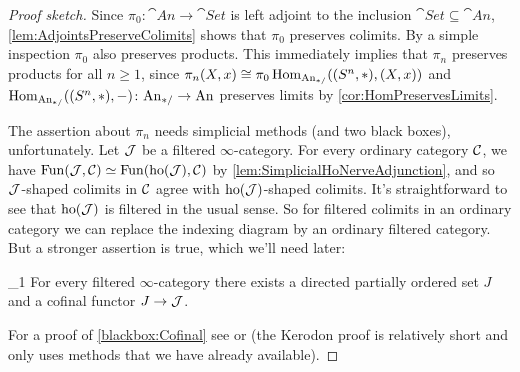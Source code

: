\begin{proof}[Proof sketch]
	Since $\pi_0\colon\cat{An}\rightarrow\cat{Set}$ is left adjoint to the inclusion $\cat{Set}\subseteq \cat{An}$, \cref{lem:AdjointsPreserveColimits} shows that $\pi_0$ preserves colimits. By a simple inspection $\pi_0$ also preserves products. This immediately implies that $\pi_n$ preserves products for all $n\geqslant 1$, since $\pi_n(X,x)\cong \pi_0\operatorname{Hom}_{\mathrm{An}_{*/}}((S^n,*),(X,x))$ and $\operatorname{Hom}_{\mathrm{An}_{*/}}((S^n,*),-)\colon \mathrm{An}_{*/}\rightarrow \mathrm{An}$ preserves limits by \cref{cor:HomPreservesLimits}.
	
	The assertion about $\pi_n$ needs simplicial methods (and two black boxes), unfortunately. Let $\mathcal{J}$ be a filtered $\infty$-category. For every ordinary category $\mathcal{C}$, we have $\operatorname{Fun}(\mathcal{J},\mathcal{C})\simeq \operatorname{Fun}(\operatorname{ho}(\mathcal{J}),\mathcal{C})$ by \cref{lem:SimplicialHoNerveAdjunction}, and so $\mathcal{J}$-shaped colimits in $\mathcal{C}$ agree with $\operatorname{ho}(\mathcal{J})$-shaped colimits. It's straightforward to see that $\operatorname{ho}(\mathcal{J})$ is filtered in the usual sense. So for filtered colimits in an ordinary category we can replace the indexing diagram by an ordinary filtered category. But a stronger assertion is true, which we'll need later:
	\begin{alphanumerate}\itshape
		\item[\blacksquare_1] For every filtered $\infty$-category there exists a directed partially ordered set $J$ and a cofinal functor $J\rightarrow \mathcal{J}$.\label{blackbox:Cofinal}
	\end{alphanumerate}
	For a proof of \cref{blackbox:Cofinal} see \cite[Proposition~]{HTT} or \cite[Tag~\href{https://kerodon.net/tag/02QA}{02QA}]{Kerodon} (the Kerodon proof is relatively short and only uses methods that we have already available).
	

\end{proof}
